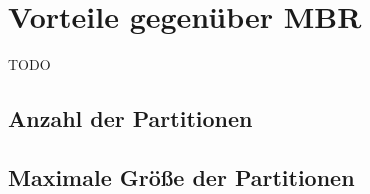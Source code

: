 \section{Vorteile gegenüber MBR}
\label{sec:gpt_advantages}
TODO

\subsection{Anzahl der Partitionen}

\subsection{Maximale Größe der Partitionen}
